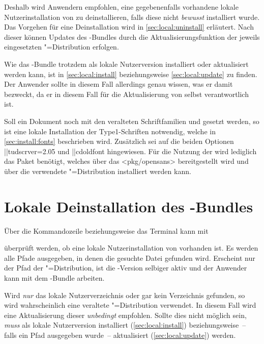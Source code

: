 Deshalb wird Anwendern empfohlen, eine gegebenenfalls vorhandene lokale 
Nutzerinstallation von \TUDScript zu deinstallieren, falls diese nicht 
\emph{bewusst} installiert wurde. Das Vorgehen für eine Deinstallation wird in 
\autoref{sec:local:uninstall} erläutert. Nach dieser können Updates des 
\TUDScript-Bundles durch die Aktualisierungsfunktion der jeweils eingesetzten 
"=Distribution erfolgen. 

Wie das \TUDScript-Bundle trotzdem als lokale Nutzerversion installiert oder 
aktualisiert werden kann, ist in \autoref{sec:local:install} beziehungsweise 
\autoref{sec:local:update} zu finden. Der Anwender sollte in diesem Fall 
allerdings genau wissen, was er damit bezweckt, da er in diesem Fall für die 
Aktualisierung von \TUDScript selbst verantwortlich ist.

%
%
Soll ein Dokument noch mit den veralteten Schriftfamilien \Univers und \DIN 
gesetzt werden, so ist eine lokale Installation der Type1-Schriften notwendig, 
welche in \autoref{sec:install:fonts} beschrieben wird. Zusätzlich sei auf die 
beiden Optionen \Option||{tudscrver=2.05} und \Option||{cdoldfont} hingewiesen. 
Für die Nutzung der \OpenSans wird lediglich das Paket  
benötigt, welches über das \CTAN<pkg/opensans> bereitgestellt wird und über die 
verwendete "=Distribution installiert werden kann.



\section{%
  Lokale Deinstallation des \TUDScript-Bundles%
  \label{sec:local:uninstall}%
}
%
Über die Kommandozeile beziehungsweise das Terminal kann mit
%
\begin{quoting}
\end{quoting}
%
überprüft werden, ob eine lokale Nutzerinstallation von \TUDScript vorhanden 
ist. Es werden alle Pfade ausgegeben, in denen die gesuchte Datei gefunden 
wird. Erscheint nur der Pfad der "=Distribution, ist die 
\TUDScript-Version selbiger aktiv und der Anwender kann mit dem 
\TUDScript-Bundle arbeiten.

Wird \emph{nur} das lokale Nutzerverzeichnis oder gar kein Verzeichnis 
gefunden, so wird wahrscheinlich eine veraltete "=Distribution 
verwendet. In diesem Fall wird eine Aktualisierung dieser \emph{unbedingt} 
empfohlen. Sollte dies nicht möglich sein, \emph{muss} \TUDScript als lokale 
Nutzerversion installiert (\autoref{sec:local:install}) beziehungsweise~-- 
falls ein Pfad ausgegeben wurde~-- aktualisiert (\autoref{sec:local:update}) 
werden.

